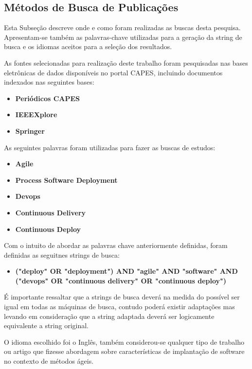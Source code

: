 \documentclass[12pt]{article}
\begin{document}
\subsection{Métodos de Busca de Publicações} \label{sec3:subsec3}

Esta  Subseção  descreve  onde  e  como  foram  realizadas
as  buscas  desta  pesquisa. Apresentam-se também as palavras-chave utilizadas para a geração da string  de busca e os idiomas aceitos para a seleção dos resultados.

As fontes selecionadas para realização deste trabalho foram pesquisadas nas bases eletrônicas de dados disponíveis no portal CAPES, incluindo documentos indexados nas seguintes bases:

 \begin{itemize}
   \item  \textbf{Periódicos CAPES}
   \item  \textbf{IEEEXplore}
   \item  \textbf{Springer}
 \end{itemize}

As seguintes palavras foram utilizadas para fazer as buscas de estudos:

 \begin{itemize}
   \item  \textbf{Agile}
   \item  \textbf{Process Software Deployment}
   \item  \textbf{Devops}
   \item  \textbf{Continuous Delivery}
   \item  \textbf{Continuous Deploy}

 \end{itemize}

Com o intuito de abordar as palavras chave anteriormente definidas, foram definidas as seguitnes strings de busca:

 \begin{itemize}
   \item  \textbf{("deploy" OR "deployment") AND  "agile" AND "software" AND ("devops" OR "continuous delivery" OR "continuous deploy") }
 \end{itemize}

É importante ressaltar que a strings de busca deverá na medida do possível ser igual em todas as máquinas de busca, contudo poderá existir adaptações mas levando em consideração que a string adaptada deverá ser logicamente equivalente a string original.

O idioma escolhido foi o Inglês, também considerou-se qualquer tipo de trabalho ou artigo que fizesse abordagem sobre características de implantação de software no contexto de métodos ágeis.
\end{document}
